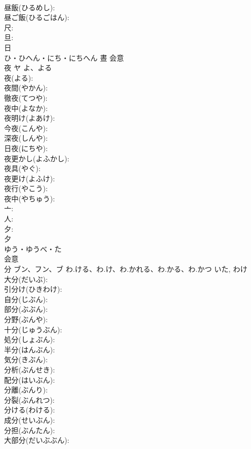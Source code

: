 \documentclass[8pt]{extreport}
\begin{document}
\begin{CJK}{UTF8}{min}
\\	昼飯(ひるめし): 
\\	昼ご飯(ひるごはん): 
\\	尺: 
\\	旦: 
\\	日	
\\	ひ・ひへん・にち・にちへん	晝	会意 
\\	夜	ヤ	よ、よる		
\\	夜(よる): 
\\	夜間(やかん): 
\\	徹夜(てつや): 
\\	夜中(よなか): 
\\	夜明け(よあけ): 
\\	今夜(こんや): 
\\	深夜(しんや): 
\\	日夜(にちや): 
\\	夜更かし(よふかし): 
\\	夜具(やぐ): 
\\	夜更け(よふけ): 
\\	夜行(やこう): 
\\	夜中(やちゅう): 
\\	亠: 
\\	人: 
\\	夕: 
\\	夕	
\\	ゆう・ゆうべ・た	
\\	会意 
\\	分	ブン、フン、ブ	わ.ける、わ.け、わ.かれる、わ.かる、わ.かつ	いた, わけ	
\\	大分(だいぶ): 
\\	引分け(ひきわけ): 
\\	自分(じぶん): 
\\	部分(ぶぶん): 
\\	分野(ぶんや): 
\\	十分(じゅうぶん): 
\\	処分(しょぶん): 
\\	半分(はんぶん): 
\\	気分(きぶん): 
\\	分析(ぶんせき): 
\\	配分(はいぶん): 
\\	分離(ぶんり): 
\\	分裂(ぶんれつ): 
\\	分ける(わける): 
\\	成分(せいぶん): 
\\	分担(ぶんたん): 
\\	大部分(だいぶぶん): 

\end{CJK}
\end{document}
